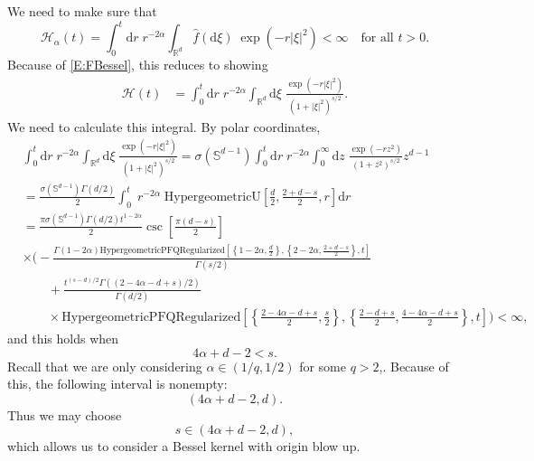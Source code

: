 \documentclass{article}
\numberwithin{equation}{section}
\newcommand{\R}{\mathbb{R}}
\newcommand{\ud}{\ensuremath{\mathrm{d}}}
\begin{document}
We need to make sure that
	\[
		\mathcal{H}_{\alpha}(t) = \int_0^t \ud r \; r^{-2\alpha} \int_{\R^d} \hat{f}(\ud \xi) \; \exp\left(-r|\xi|^2\right) < \infty \quad \text{for all } t>0.
	\]
Because of \eqref{E:FBessel}, this reduces to showing
	\begin{align*}
		\mathcal{H}(t) &= \int_0^t \ud r \; r^{-2\alpha} \int_{\R^d} \ud \xi \; \frac{\exp(-r|\xi|^2)}{ (1+|\xi|^2)^{s/2}}.
	\end{align*}
We need to calculate this integral. By polar coordinates,
	\begin{align*}
		& \int_0^t \ud r \; r^{-2\alpha}  \int_{\R^d} \ud \xi \; \frac{\exp(-r|\xi|^2)}{ (1+|\xi|^2)^{s/2}} = 	\sigma\left(\mathbb{S}^{d-1}\right)\int_0^t \ud r \; r^{-2\alpha} \int_0^\infty \ud z \; \frac{\exp(-r z^2)}{(1+z^2)^{s/2}} z^{d-1} \\
		&= \frac{\sigma\left(\mathbb{S}^{d-1}\right) \Gamma(d/2)}{2}\int_0^t  \; r^{-2\alpha} \; \text{HypergeometricU}\left[\frac{d}{2}, \frac{2+d-s}{2}, r\right] \ud r \\
		&=  \frac{\pi \sigma\left(\mathbb{S}^{d-1}\right) \Gamma(d/2) t^{1-2\alpha}}{2} \csc\left[\frac{\pi(d-s)}{2}\right] \\
		& \times \Bigg(- \frac{\Gamma(1-2\alpha)\text{HypergeometricPFQRegularized}\left[\left\{ 1-2\alpha, \frac{d}{2} \right\}, \left\{ 2-2\alpha, \frac{2+d-s}{2} \right\}, t\right] }{ \Gamma(s/2) } \\
		& \qquad + \frac{ t^{(s-d)/2} \Gamma((2-4\alpha-d+s)/2)}{\Gamma(d/2) } \\
		& \qquad \times \text{HypergeometricPFQRegularized}\left[ \left\{ \frac{2-4\alpha-d+s}{2}, \frac{s}{2} \right\}, \left\{ \frac{2-d+s}{2}, \frac{4-4\alpha-d+s}{2} \right\}, t \right]   \Bigg) < \infty,
	\end{align*}
and this holds when
	\begin{equation}
		4\alpha + d -2 < s.
	\end{equation}
Recall that we are only considering $\alpha \in (1/q, 1/2)$ for some $q>2$,. Because of this, the following interval is nonempty:
	\begin{equation}
		(4\alpha + d -2 , d).
	\end{equation}
Thus we may choose
	\begin{equation} \label{E:BesParamCond}
		s \in (4\alpha + d -2 , d),
	\end{equation}
which allows us to consider a Bessel kernel with origin blow up.
\end{document}

